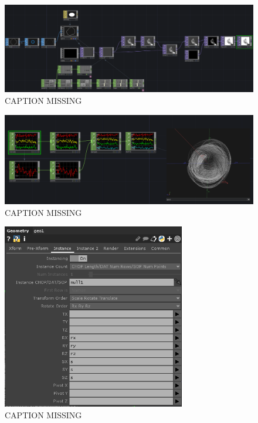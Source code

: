 \begin{figure}[H]
  \centering
  \includegraphics[width=\textwidth]{img/ggForms02.PNG}
  \caption[shortCaption]
  {CAPTION MISSING}
  \label{fig:label}
\end{figure}

\begin{figure}[H]
  \centering
  \includegraphics[width=\textwidth]{img/instancing1.PNG}
  \caption[shortCaption]
  {CAPTION MISSING}
  \label{fig:label}
\end{figure}

\begin{figure}[H]
  \centering
  \includegraphics[width=8cm]{img/instancing2.PNG}
  \caption[shortCaption]
  {CAPTION MISSING}
  \label{fig:label}
\end{figure}

